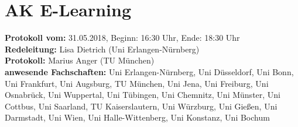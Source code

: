
\section{AK E-Learning}

\textbf{Protokoll vom:} 31.05.2018,
Beginn: 16:30 Uhr,
Ende: 18:30 Uhr \\
\textbf{Redeleitung:} Lisa Dietrich (Uni Erlangen-Nürnberg) \\
\textbf{Protokoll:} Marius Anger (TU München) \\
\textbf{anwesende Fachschaften:} Uni Erlangen-Nürnberg, Uni Düsseldorf, Uni Bonn, Uni Frankfurt, Uni Augsburg,
TU München, Uni Jena, Uni Freiburg, Uni Osnabrück, Uni Wuppertal, Uni Tübingen, Uni Chemnitz, Uni Münster, Uni Cottbus, Uni Saarland,
TU Kaiserslautern, Uni Würzburg, Uni Gießen, Uni Darmstadt, Uni Wien, Uni Halle-Wittenberg, Uni Konstanz, Uni Bochum

